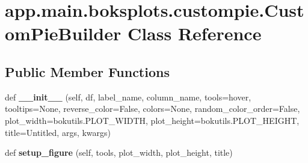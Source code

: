 \hypertarget{classapp_1_1main_1_1boksplots_1_1custompie_1_1CustomPieBuilder}{}\section{app.\+main.\+boksplots.\+custompie.\+Custom\+Pie\+Builder Class Reference}
\label{classapp_1_1main_1_1boksplots_1_1custompie_1_1CustomPieBuilder}
\subsection*{Public Member Functions}
\begin{DoxyCompactItemize}
\item 
\mbox{\label{classapp_1_1main_1_1boksplots_1_1custompie_1_1CustomPieBuilder_ad2496bea2b724544cc91c3eb08852262}} 
def {\bfseries \+\_\+\+\_\+init\+\_\+\+\_\+} (self, df, label\+\_\+name, column\+\_\+name, tools=\textquotesingle{}hover\textquotesingle{}, tooltips=None, reverse\+\_\+color=False, colors=None, random\+\_\+color\+\_\+order=False, plot\+\_\+width=bokutils.\+P\+L\+O\+T\+\_\+\+W\+I\+D\+TH, plot\+\_\+height=bokutils.\+P\+L\+O\+T\+\_\+\+H\+E\+I\+G\+HT, title=\textquotesingle{}Untitled\textquotesingle{}, args, kwargs)
\item 
\mbox{\label{classapp_1_1main_1_1boksplots_1_1custompie_1_1CustomPieBuilder_abc5606033b421af199fea19d4a587d28}} 
def {\bfseries setup\+\_\+figure} (self, tools, plot\+\_\+width, plot\+\_\+height, title)
\end{DoxyCompactItemize}
